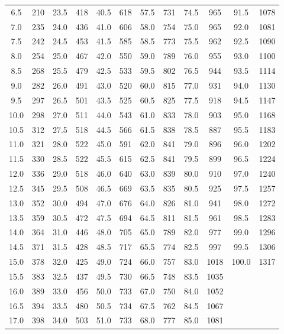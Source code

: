 \documentclass[10pt,a4paper]{ctexart}
\begin{document}
\begin{table}[H]
{\begin{tabular}{@{}cc | cc | cc | cc | cc | cc@{}}
        6.5 & 210 & 23.5 & 418 & 40.5 & 618 & 57.5 & 731 & 74.5 & 965 & 91.5 & 1078 \\
        7.0 & 235 & 24.0 & 436 & 41.0 & 606 & 58.0 & 754 & 75.0 & 965 & 92.0 & 1081 \\
        7.5 & 242 & 24.5 & 453 & 41.5 & 585 & 58.5 & 773 & 75.5 & 962 & 92.5 & 1090 \\
        8.0 & 254 & 25.0 & 467 & 42.0 & 550 & 59.0 & 789 & 76.0 & 955 & 93.0 & 1100 \\
        8.5 & 268 & 25.5 & 479 & 42.5 & 533 & 59.5 & 802 & 76.5 & 944 & 93.5 & 1114 \\
        9.0 & 282 & 26.0 & 491 & 43.0 & 520 & 60.0 & 815 & 77.0 & 931 & 94.0 & 1130 \\
        9.5 & 297 & 26.5 & 501 & 43.5 & 525 & 60.5 & 825 & 77.5 & 918 & 94.5 & 1147 \\
        10.0 & 298 & 27.0 & 511 & 44.0 & 543 & 61.0 & 833 & 78.0 & 903 & 95.0 & 1168 \\
        10.5 & 312 & 27.5 & 518 & 44.5 & 566 & 61.5 & 838 & 78.5 & 887 & 95.5 & 1183 \\
        11.0 & 321 & 28.0 & 522 & 45.0 & 591 & 62.0 & 841 & 79.0 & 896 & 96.0 & 1202 \\
        11.5 & 330 & 28.5 & 522 & 45.5 & 615 & 62.5 & 841 & 79.5 & 899 & 96.5 & 1224 \\
        12.0 & 336 & 29.0 & 518 & 46.0 & 640 & 63.0 & 839 & 80.0 & 910 & 97.0 & 1240 \\
        12.5 & 345 & 29.5 & 508 & 46.5 & 669 & 63.5 & 835 & 80.5 & 925 & 97.5 & 1257 \\
        13.0 & 352 & 30.0 & 494 & 47.0 & 676 & 64.0 & 826 & 81.0 & 941 & 98.0 & 1272 \\
        13.5 & 359 & 30.5 & 472 & 47.5 & 694 & 64.5 & 811 & 81.5 & 961 & 98.5 & 1283 \\
        14.0 & 364 & 31.0 & 446 & 48.0 & 705 & 65.0 & 789 & 82.0 & 977 & 99.0 & 1296 \\
        14.5 & 371 & 31.5 & 428 & 48.5 & 717 & 65.5 & 774 & 82.5 & 997 & 99.5 & 1306 \\
        15.0 & 378 & 32.0 & 425 & 49.0 & 724 & 66.0 & 757 & 83.0 & 1018 & 100.0 & 1317 \\
        15.5 & 383 & 32.5 & 437 & 49.5 & 730 & 66.5 & 748 & 83.5 & 1035 & & \\
        16.0 & 389 & 33.0 & 456 & 50.0 & 733 & 67.0 & 750 & 84.0 & 1052 & & \\
        16.5 & 394 & 33.5 & 480 & 50.5 & 734 & 67.5 & 762 & 84.5 & 1067 & & \\
        17.0 & 398 & 34.0 & 503 & 51.0 & 733 & 68.0 & 777 & 85.0 & 1081 & & \\
        \bottomrule
    \end{tabular}%
    }
\end{table}
\end{document}
